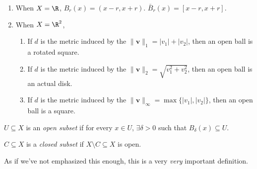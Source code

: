 \documentclass[a4paper]{article}
\begin{document}
\begin{eg}\leavevmode
  \begin{enumerate}
    \item When $X = \R$, $B_r(x) = (x - r, x + r)$. $\bar{B}_r(x) = [x - r, x + r]$.
    \item When $X = \R^2$,
      \begin{enumerate}
        \item If $d$ is the metric induced by the $\|\mathbf{v}\|_1 = |v_1| + |v_2|$, then an open ball is a rotated square.
          \begin{center}
          \end{center}
        \item If $d$ is the metric induced by the $\|\mathbf{v}\|_2 = \sqrt{v_1^2 + v_2^2}$, then an open ball is an actual disk.
          \begin{center}
          \end{center}

        \item If $d$ is the metric induced by the $\|\mathbf{v}\|_\infty = \max\{|v_1|, |v_2|\}$, then an open ball is a square.
          \begin{center}
          \end{center}
      \end{enumerate}
  \end{enumerate}
\end{eg}
\begin{defi}
  $U\subseteq X$ is an \emph{open subset} if for every $x\in U$, $\exists \delta > 0$ such that $B_\delta(x) \subseteq U$.

  $C\subseteq X$ is a \emph{closed subset} if $X\setminus C \subseteq X$ is open.
\end{defi}
As if we've not emphasized this enough, this is a very \emph{very} important definition.
\end{document}
